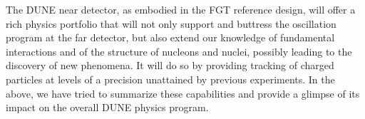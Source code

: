The DUNE near detector, as embodied in the FGT reference design, will
offer a rich physics portfolio that will not only support and buttress
the oscillation program at the far detector, but also extend our
knowledge of fundamental interactions and of the structure of nucleons
and nuclei, possibly leading to the discovery of new phenomena. It
will do so by providing tracking of charged particles at levels of a
precision unattained by previous experiments.  In the above, we have
tried to summarize these capabilities and provide a glimpse of its
impact on the overall DUNE physics program.



%


